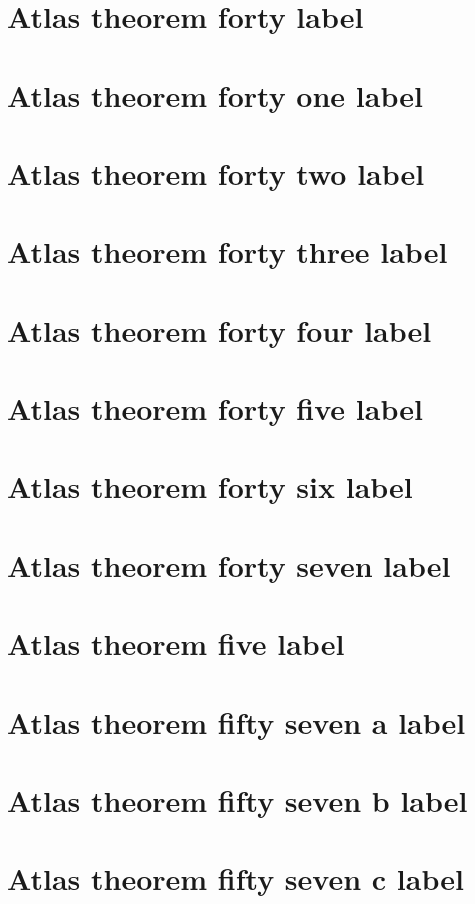 \documentclass[11pt]{article}
\theoremstyle{definition}
\begin{document}
\section{Atlas theorem forty label}
\label{ll:labels:atlas-t40}
\section{Atlas theorem forty one label}
\label{ll:labels:atlas-t41}
\section{Atlas theorem forty two label}
\label{ll:labels:atlas-t42}
\section{Atlas theorem forty three label}
\label{ll:labels:atlas-t43}
\section{Atlas theorem forty four label}
\label{ll:labels:atlas-t44}
\section{Atlas theorem forty five label}
\label{ll:labels:atlas-t45}
\section{Atlas theorem forty six label}
\label{ll:labels:atlas-t46}
\section{Atlas theorem forty seven label}
\label{ll:labels:atlas-t47}
\section{Atlas theorem five label}
\label{ll:labels:atlas-t5}
\section{Atlas theorem fifty seven a label}
\label{ll:labels:atlas-t57a}
\section{Atlas theorem fifty seven b label}
\label{ll:labels:atlas-t57b}
\section{Atlas theorem fifty seven c label}
\label{ll:labels:atlas-t57c}
\end{document}

